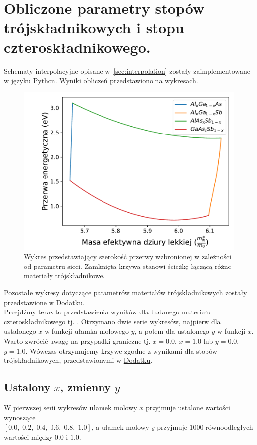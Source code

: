 \documentclass[12pt,openany,a4paper]{book}
\begin{document}
\section{Obliczone parametry stopów trójskładnikowych i stopu czteroskładnikowego.}

Schematy interpolacyjne opisane w~\ref{sec:interpolation} zostały zaimplementowane w języku Python.
Wyniki obliczeń przedstawiono na wykresach.\\

\begin{figure}[H]
	\centering
	\includegraphics[width = 0.8\linewidth]{Figures/ternary/Eg_alc.pdf}
	\caption{Wykres przedstawiający szerokość przerwy wzbronionej w zależności od parametru sieci.
	Zamknięta krzywa stanowi ścieżkę łączącą różne materiały trójskładnikowe.}\label{fig:Eg_alc}
\end{figure}
\pagebreak
Pozostałe wykresy dotyczące parametrów materiałów trójskładnikowych zostały przedstawione w \hyperref[chapt:dodatek]{Dodatku}.\\

Przejdźmy teraz to przedstawienia wyników dla badanego materiału 
czteroskładnikowego tj. . 
Otrzymano dwie serie wykresów, najpierw dla ustalonego \(x\) w funkcji ułamka
molowego \(y\), a potem dla ustalonego \(y\) w funkcji \(x\). Warto zwrócić uwagę
na przypadki graniczne tj. \(x = 0.0\), \(x =  1.0\) lub \(y = 0.0\), \(y =  1.0\). Wówczas otrzymujemy
krzywe zgodne z wynikami dla stopów trójskładnikowych, przedstawionymi w \hyperref[chapt:dodatek]{Dodatku}.

\subsection{Ustalony \(x\), zmienny \(y\)}
W pierwszej serii wykresów ułamek molowy \(x\) przyjmuje ustalone
wartości wynoszące\\
 \([0.0,\;0.2,\; 0.4,\; 0.6,\; 0.8,\; 1.0]\), a ułamek molowy \(y\)
przyjmuje \(1000\) równoodległych wartości między \(0.0\) i \(1.0\).
\end{document}
